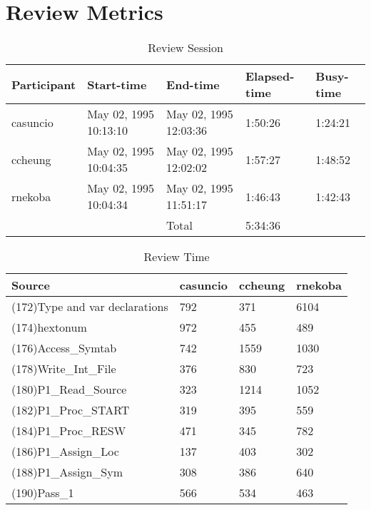 \section{Review Metrics}
\begin{table}[hb]
\begin{center}
\begin{tabular}{|l|l|l|l|l|}
\hline
Participant & Start-time & End-time & Elapsed-time & Busy-time \\
\hline
casuncio & May 02, 1995 10:13:10 & May 02, 1995 12:03:36 & 1:50:26 & 1:24:21 \\
ccheung & May 02, 1995 10:04:35 & May 02, 1995 12:02:02 & 1:57:27 & 1:48:52 \\
rnekoba & May 02, 1995 10:04:34 & May 02, 1995 11:51:17 & 1:46:43 & 1:42:43 \\
\hline
 & & Total & 5:34:36 & \\
\hline
\end{tabular}
\end{center}
\caption{Review Session}
\end{table}


\begin{table}[hb]
\begin{center}
\begin{tabular}{|l|l|l|l|}
\hline
Source & casuncio & ccheung & rnekoba\\
\hline
(172)Type and var declarations & 792 & 371 & 6104\\
(174)hextonum & 972 & 455 & 489\\
(176)Access\_Symtab & 742 & 1559 & 1030\\
(178)Write\_Int\_File & 376 & 830 & 723\\
(180)P1\_Read\_Source & 323 & 1214 & 1052\\
(182)P1\_Proc\_START & 319 & 395 & 559\\
(184)P1\_Proc\_RESW & 471 & 345 & 782\\
(186)P1\_Assign\_Loc & 137 & 403 & 302\\
(188)P1\_Assign\_Sym & 308 & 386 & 640\\
(190)Pass\_1 & 566 & 534 & 463\\
\hline
\end{tabular}
\end{center}
\caption{Review Time}
\end{table}

